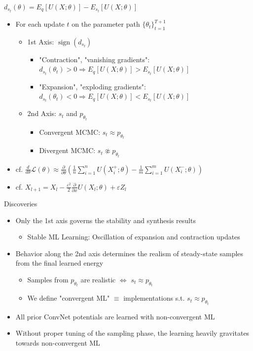 \documentclass{beamer}
\DeclareMathOperator{\sign}{sign}
\begin{document}
\begin{frame}{$d_{s_t}(\theta)=E_q[U(X;\theta)]-E_{s_t}[U(X;\theta)]$}
\begin{itemize}
\item For each update $t$ on the parameter path $\{\theta_t\}^{T+1}_{t=1}$
\begin{itemize}
\item 1st Axis: $\sign(d_{s_t})$
\begin{itemize}
\item "Contraction", "vanishing gradients": $d_{s_t}(\theta_t)>0\Rightarrow E_q[U(X;\theta)]>E_{s_t}[U(X;\theta)]$
\item "Expansion", "exploding gradients": $d_{s_t}(\theta_t)<0\Rightarrow E_q[U(X;\theta)]<E_{s_t}[U(X;\theta)]$
\end{itemize}
\item 2nd Axis: $s_t$ and $p_{\theta_t}$
\begin{itemize}
\item Convergent MCMC: $s_t\approx p_{\theta_t}$
\item Divergent MCMC: $s_t\not\approx p_{\theta_t}$
\end{itemize}
\end{itemize}
\item cf. $\frac{d}{d\theta}\mathcal{L}(\theta)\approx\frac{\partial}{\partial\theta}(\frac{1}{n}\sum_{i=1}^n U(X_i^+;\theta)-\frac{1}{m}\sum_{i=1}^m U(X_i^-;\theta))$
\item cf. $X_{l+1}=X_l-\frac{\varepsilon^2}{2}\frac{\partial}{\partial x}U(X_l;\theta)+\varepsilon Z_l$
\end{itemize}
\end{frame}

\begin{frame}{Discoveries}
\begin{itemize}
\item Only the 1st axis governs the stability and synthesis results
\begin{itemize}
\item Stable ML Learning: Oscillation of expansion and contraction updates
\end{itemize}
\item Behavior along the 2nd axis determines the realism of steady-state samples from the final learned energy
\begin{itemize}
\item Samples from $p_{\theta_t}$ are realistic $\Leftrightarrow$ $s_t\approx p_{\theta_t}$
\item We define "convergent ML" $\equiv$ implementations s.t. $s_t\approx p_{\theta_t}$
\end{itemize}
\item All prior ConvNet potentials are learned
with non-convergent ML
\item Without proper tuning of the sampling phase, the learning
heavily gravitates towards non-convergent ML
\end{itemize}
\end{frame}
\end{document}
